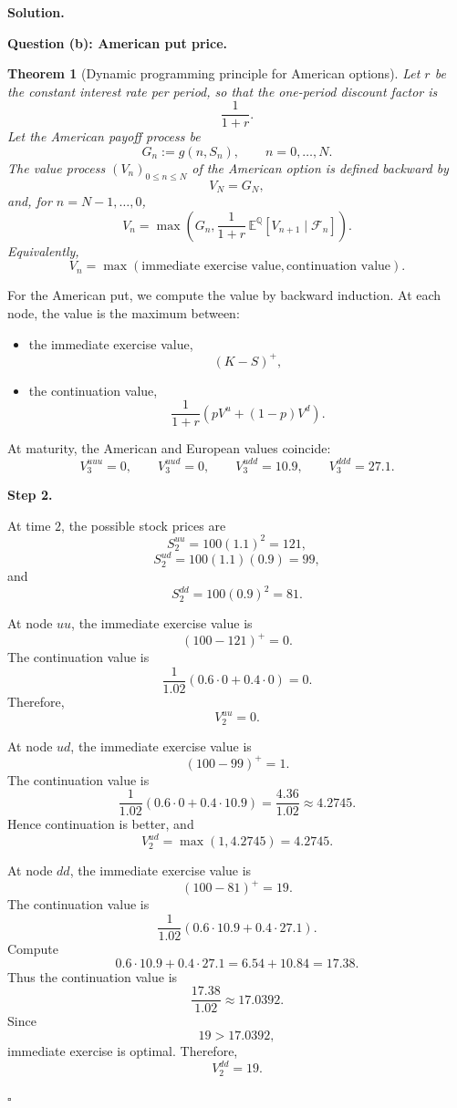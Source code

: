\documentclass[11pt]{article}
\theoremstyle{plain}
\newtheorem{theorem}{Theorem}[section]
\newcommand{\1}{\mathbf{1}}
\theoremstyle{definition}
\newenvironment{solution}
{\par\medskip\noindent\textbf{Solution.}\par\medskip}
{\hfill$\square$\par\medskip}
\newenvironment{solutionpart}[1]
{\par\medskip\noindent\textbf{#1.}\par\smallskip}
{\par\medskip}
\begin{document}
\begin{solution}
\begin{solutionpart}{Question (b): American put price}
\begin{theorem}[Dynamic programming principle for American options]
Let $r$ be the constant interest rate per period, so that the one-period discount factor is
\[
\frac{1}{1+r}.
\]
Let the American payoff process be
\[
G_n:=g(n,S_n),
\qquad n=0,\dots,N.
\]
The value process $(V_n)_{0\le n\le N}$ of the American option is defined backward by
\[
V_N=G_N,
\]
and, for $n=N-1,\dots,0$,
\[
\boxed{
V_n
=
\max\left(
G_n,
\frac{1}{1+r}\,
\mathbb E^{\mathbb Q}\left[V_{n+1}\mid \mathcal F_n\right]
\right).
}
\]
Equivalently,
\[
\boxed{
V_n
=
\max\left(
\text{immediate exercise value},
\text{continuation value}
\right).
}
\]
\end{theorem}


For the American put, we compute the value by backward induction. At each node, the value is the maximum between:

\begin{itemize}[leftmargin=1.4em]
\item the immediate exercise value,
\[
(K-S)^+,
\]
\item the continuation value,
\[
\frac{1}{1+r}
\left(
pV^{u}+(1-p)V^{d}
\right).
\]
\end{itemize}

At maturity, the American and European values coincide:
\[
V_3^{uuu}=0,
\qquad
V_3^{uud}=0,
\qquad
V_3^{udd}=10.9,
\qquad
V_3^{ddd}=27.1.
\]

\medskip

\noindent\textbf{Step 2.}

At time $2$, the possible stock prices are
\[
S_2^{uu}=100(1.1)^2=121,
\]
\[
S_2^{ud}=100(1.1)(0.9)=99,
\]
and
\[
S_2^{dd}=100(0.9)^2=81.
\]

At node $uu$, the immediate exercise value is
\[
(100-121)^+=0.
\]
The continuation value is
\[
\frac{1}{1.02}
\left(
0.6\cdot 0+0.4\cdot 0
\right)=0.
\]
Therefore,
\[
V_2^{uu}=0.
\]

At node $ud$, the immediate exercise value is
\[
(100-99)^+=1.
\]
The continuation value is
\[
\frac{1}{1.02}
\left(
0.6\cdot 0+0.4\cdot 10.9
\right)
=
\frac{4.36}{1.02}
\approx 4.2745.
\]
Hence continuation is better, and
\[
V_2^{ud}
=
\max(1,4.2745)
=
4.2745.
\]

At node $dd$, the immediate exercise value is
\[
(100-81)^+=19.
\]
The continuation value is
\[
\frac{1}{1.02}
\left(
0.6\cdot 10.9+0.4\cdot 27.1
\right).
\]
Compute
\[
0.6\cdot 10.9+0.4\cdot 27.1
=
6.54+10.84
=
17.38.
\]
Thus the continuation value is
\[
\frac{17.38}{1.02}
\approx 17.0392.
\]
Since
\[
19>17.0392,
\]
immediate exercise is optimal. Therefore,
\[
V_2^{dd}=19.
\]


\end{solutionpart}
\end{solution}
\end{document}
